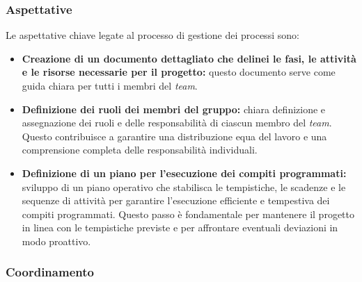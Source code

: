 \documentclass[5pt]{article}
\begin{document}
\subsubsection{Aspettative}
Le aspettative chiave legate al processo di gestione dei processi sono:
\begin{itemize}
    \item \textbf{Creazione di un documento dettagliato che delinei le fasi, le attività e le risorse necessarie per il progetto:} questo documento serve come guida chiara per tutti i membri del \textit{team}.
    \item \textbf{Definizione dei ruoli dei membri del gruppo:} chiara definizione e assegnazione dei ruoli e delle responsabilità di ciascun membro del \textit{team}. Questo contribuisce a garantire una distribuzione equa del lavoro e una comprensione completa delle responsabilità individuali.
    \item \textbf{Definizione di un piano per l'esecuzione dei compiti programmati:} sviluppo di un piano operativo che stabilisca le tempistiche, le scadenze e le sequenze di attività per garantire l'esecuzione efficiente e tempestiva dei compiti programmati. Questo passo è fondamentale per mantenere il progetto in linea con le tempistiche previste e per affrontare eventuali deviazioni in modo proattivo.
\end{itemize}

\subsubsection{Coordinamento}
\end{document}
